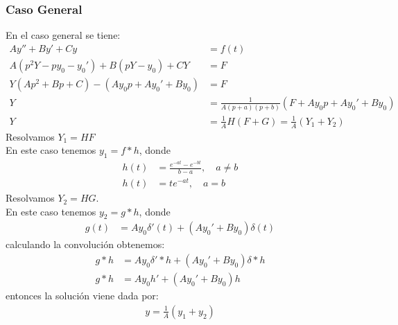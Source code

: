 \documentclass{article}
\begin{document}
\begin{tcolorbox}
    \subsubsection*{Caso General}
    En el caso general se tiene:
    \begin{align*}
        Ay'' + By' + Cy &= f(t)\\
        A(p^2Y - py_0 - y_0') + B(pY - y_0) + CY &= F \\
        Y(Ap^2 + Bp + C) - (Ay_0p + Ay_0' + By_0) &= F \\
        Y &= \frac{1}{A(p+a)(p+b)}(F + Ay_0p + Ay_0' + By_0) \\
        Y &= \frac{1}{A}H(F + G) = \frac{1}{A} (Y_1 + Y_2) 
    \end{align*} 
    Resolvamos $Y_1 = HF$ \\ 
    En este caso tenemos $y_1 = f*h$, donde 
    \begin{align*}
        h(t) &= \frac{e^{-at} - e^{-bt}}{b-a},\quad a \neq b \\ 
        h(t) &= te^{-at},\quad a=b
    \end{align*}
    Resolvamos $Y_2 = HG$. \\
    En este caso tenemos $y_2 = g*h$, donde 
    \begin{align*}
        g(t) &= Ay_0\delta'(t) + (Ay_0' + By_0)\delta(t)
    \end{align*}
    calculando la convolución obtenemos:
    \begin{align*}
        g*h &=Ay_0 \delta'*h + (Ay_0' + By_0) \delta*h \\
        g*h &=Ay_0h' + (Ay_0' + By_0)h
    \end{align*}
    entonces la solución viene dada por:
    \begin{align*}
        y = \frac{1}{A} (y_1 + y_2)
    \end{align*}
\end{tcolorbox}
\end{document}
